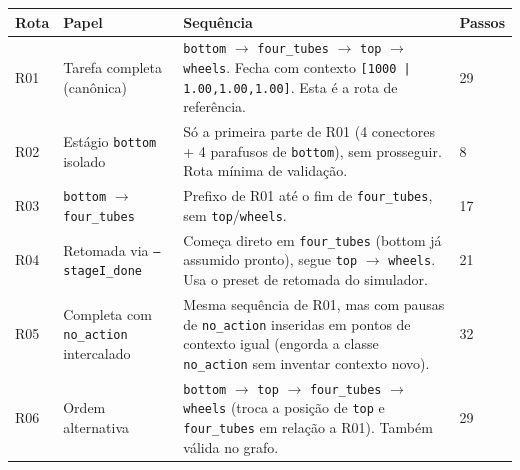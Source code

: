 \documentclass[11pt,a4paper]{article}
\begin{document}
\begin{longtable}{p{1cm}p{3.2cm}p{8cm}p{1.3cm}}
\toprule
\textbf{Rota} & \textbf{Papel} & \textbf{Sequência} & \textbf{Passos} \\
\midrule
\endhead
R01 & Tarefa completa (canônica) & \texttt{bottom} $\to$ \texttt{four\_tubes} $\to$ \texttt{top} $\to$ \texttt{wheels}. Fecha com contexto \texttt{[1000\,|\,1.00,1.00,1.00]}. Esta é a rota de referência. & 29 \\
R02 & Estágio \texttt{bottom} isolado & Só a primeira parte de R01 (4 conectores + 4 parafusos de \texttt{bottom}), sem prosseguir. Rota mínima de validação. & 8 \\
R03 & \texttt{bottom} $\to$ \texttt{four\_tubes} & Prefixo de R01 até o fim de \texttt{four\_tubes}, sem \texttt{top}/\texttt{wheels}. & 17 \\
R04 & Retomada via \texttt{--stageI\_done} & Começa direto em \texttt{four\_tubes} (bottom já assumido pronto), segue \texttt{top} $\to$ \texttt{wheels}. Usa o preset de retomada do simulador. & 21 \\
R05 & Completa com \texttt{no\_action} intercalado & Mesma sequência de R01, mas com pausas de \texttt{no\_action} inseridas em pontos de contexto igual (engorda a classe \texttt{no\_action} sem inventar contexto novo). & 32 \\
R06 & Ordem alternativa & \texttt{bottom} $\to$ \texttt{top} $\to$ \texttt{four\_tubes} $\to$ \texttt{wheels} (troca a posição de \texttt{top} e \texttt{four\_tubes} em relação a R01). Também válida no grafo. & 29 \\
\bottomrule
\end{longtable}
\end{document}
